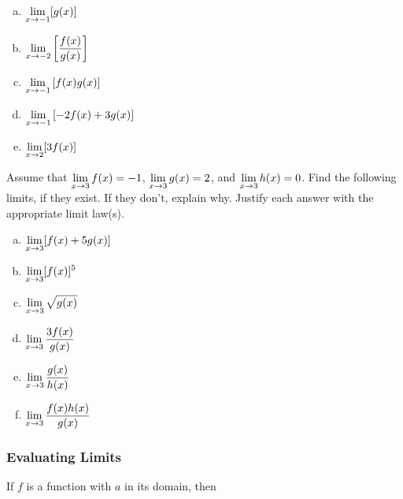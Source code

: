 \documentclass[notes]{subfiles}
\begin{document}
\begin{ex}
\begin{minipage}{.58\textwidth}
\begin{flushleft}
\begin{multicols*}{2}
\begin{enumerate}[(a)]
								\vspace{1in}
							\item \(\displaystyle \lim_{x\to -1} [g(x)]\)
								\vspace{1in}
							\item \(\displaystyle \lim_{x\to -2}\left[\dfrac{f(x)}{g(x)}\right]\)
								\vspace{1in}
								\columnbreak 
							\item \(\displaystyle \lim_{x\to -1}\left[f(x)g(x)\right]\)
								\vspace{1in}
							\item \(\displaystyle \lim_{x\to -1}\left[-2f(x)+3g(x)\right]\)
								\vspace{1.1in}
							\item \(\displaystyle \lim_{x\to 2} [3f(x)]\)
								\vspace{1in}
						\end{enumerate}
							\raggedcolumns
					\end{multicols*}
				\end{flushleft}
			\end{minipage}
		\end{ex}

		\begin{ex}
			Assume that \(\displaystyle \lim_{x\to 3} f(x) = -1\), \(\displaystyle \lim_{x\to 3} g(x) = 2\), and \(\displaystyle \lim_{x\to 3} h(x) = 0\).  Find the following limits, if they exist.  If they don't, explain why.  Justify each answer with the appropriate limit law(s).
			\begin{enumerate}[(a)]
				\item \(\displaystyle \lim_{x\to 3} [f(x) + 5g(x)]\)
				\item \(\displaystyle \lim_{x\to 3} [f(x)]^5\)
				
				\item \(\displaystyle \lim_{x\to 3} \sqrt{g(x)}\)
					\newpage

				\item \(\displaystyle \lim_{x\to 3} \dfrac{3f(x)}{g(x)}\)
					
				\item \(\displaystyle \lim_{x\to 3} \dfrac{g(x)}{h(x)}\)
					
				\item \(\displaystyle \lim_{x\to 3} \dfrac{f(x)h(x)}{g(x)}\)
			\end{enumerate}
		\end{ex}

	\subsubsection*{Evaluating Limits}
		\begin{rmk}
			If \(f\) is a  function with \(a\) in its domain, then 
				\\ \\ \\
		\end{rmk}	
\end{document}
